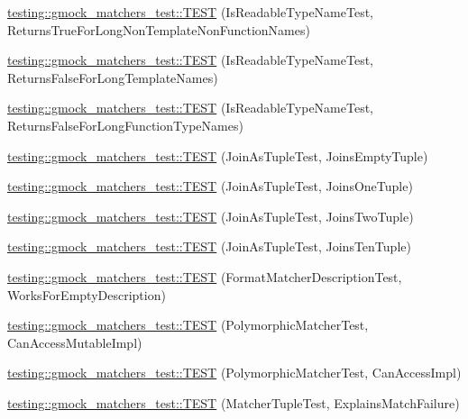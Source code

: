 \begin{DoxyCompactItemize}
\hyperlink{namespacetesting_1_1gmock__matchers__test_a839515535e3e75d4f80ba6ae8f7347ec}{testing\+::gmock\+\_\+matchers\+\_\+test\+::\+T\+E\+ST} (Is\+Readable\+Type\+Name\+Test, Returns\+True\+For\+Long\+Non\+Template\+Non\+Function\+Names)
\item 
\hyperlink{namespacetesting_1_1gmock__matchers__test_ad1630d47de9f4fcdc00ab4962eaeea05}{testing\+::gmock\+\_\+matchers\+\_\+test\+::\+T\+E\+ST} (Is\+Readable\+Type\+Name\+Test, Returns\+False\+For\+Long\+Template\+Names)
\item 
\hyperlink{namespacetesting_1_1gmock__matchers__test_a30516b1c70e14132d1d87ab08b96aa2f}{testing\+::gmock\+\_\+matchers\+\_\+test\+::\+T\+E\+ST} (Is\+Readable\+Type\+Name\+Test, Returns\+False\+For\+Long\+Function\+Type\+Names)
\item 
\hyperlink{namespacetesting_1_1gmock__matchers__test_aa633c0b7e0f0316c23bff10e9963f773}{testing\+::gmock\+\_\+matchers\+\_\+test\+::\+T\+E\+ST} (Join\+As\+Tuple\+Test, Joins\+Empty\+Tuple)
\item 
\hyperlink{namespacetesting_1_1gmock__matchers__test_acaec7fcf41bb1cdf7124b443e7ab28e8}{testing\+::gmock\+\_\+matchers\+\_\+test\+::\+T\+E\+ST} (Join\+As\+Tuple\+Test, Joins\+One\+Tuple)
\item 
\hyperlink{namespacetesting_1_1gmock__matchers__test_a0831a9160c5420fcd363e4a520f0fb61}{testing\+::gmock\+\_\+matchers\+\_\+test\+::\+T\+E\+ST} (Join\+As\+Tuple\+Test, Joins\+Two\+Tuple)
\item 
\hyperlink{namespacetesting_1_1gmock__matchers__test_a56811b12ff298040a3d44dba0a2e4a8e}{testing\+::gmock\+\_\+matchers\+\_\+test\+::\+T\+E\+ST} (Join\+As\+Tuple\+Test, Joins\+Ten\+Tuple)
\item 
\hyperlink{namespacetesting_1_1gmock__matchers__test_ae104f652fab7d1b3c3873f6987401481}{testing\+::gmock\+\_\+matchers\+\_\+test\+::\+T\+E\+ST} (Format\+Matcher\+Description\+Test, Works\+For\+Empty\+Description)
\item 
\hyperlink{namespacetesting_1_1gmock__matchers__test_ae29925e94a9396fe3c7fab6efaff8d8a}{testing\+::gmock\+\_\+matchers\+\_\+test\+::\+T\+E\+ST} (Polymorphic\+Matcher\+Test, Can\+Access\+Mutable\+Impl)
\item 
\hyperlink{namespacetesting_1_1gmock__matchers__test_a918a64c4594ef6b30f53d735c2e6e6ac}{testing\+::gmock\+\_\+matchers\+\_\+test\+::\+T\+E\+ST} (Polymorphic\+Matcher\+Test, Can\+Access\+Impl)
\item 
\hyperlink{namespacetesting_1_1gmock__matchers__test_abc9816afa3c83fc92e2c6ecfb2dd8e63}{testing\+::gmock\+\_\+matchers\+\_\+test\+::\+T\+E\+ST} (Matcher\+Tuple\+Test, Explains\+Match\+Failure)

\end{DoxyCompactItemize}
